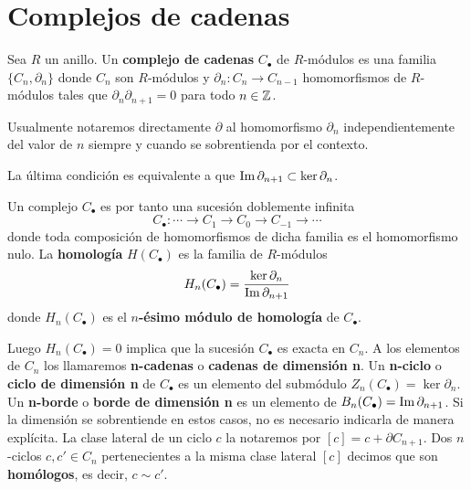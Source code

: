 \section{Complejos de cadenas}

\begin{definicion}
	Sea \(R\) un anillo. Un \textbf{complejo de cadenas} \(C_{\bullet}\) de \(R\)-módulos
	es una familia \(\{C_{n}, \partial_{n}\}\) donde \(C_{n}\) son \(R\)-módulos y \(\partial
	_{n} : C_{n} \rightarrow C_{n-1}\) homomorfismos de \(R\)-módulos tales que \(\partial
	_{n} \partial_{n+1}= 0\) para todo \(n \in \mathbb{Z}\).
\end{definicion}
\begin{nota}
	Usualmente notaremos directamente \(\partial\) al homomorfismo \(\partial_{n}\) independientemente
	del valor de \(n\) siempre y cuando se sobrentienda por el contexto.
\end{nota}
\begin{observacion}
	La última condición es equivalente a que \(\operatorname{Im}{\partial_{n+1}}\subset \ker{\partial_n}\).
\end{observacion}
Un complejo \(C_{\bullet}\) es por tanto una sucesión doblemente infinita
\[
	C_{\bullet}: \cdots \rightarrow C_{1}\rightarrow C_{0} \rightarrow C_{-1}\rightarrow
	\cdots
\]
donde toda composición de homomorfismos de dicha familia es el homomorfismo nulo.
La \textbf{homología} \(H(C_{\bullet})\) es la familia de \(R\)-módulos
\[
	H_{n}(C_{\bullet}) = \frac{\ker \partial_{n}}{\operatorname{Im} \partial_{n+1}}
\]
donde \(H_{n}(C_{\bullet})\) es el \textbf{\(n\)-ésimo módulo de homología} de \(C_{\bullet}\).

Luego \(H_{n}(C_{\bullet})=0\) implica que la sucesión \(C_{\bullet}\) es exacta en \(C
_{n}\). A los elementos de \(C_{n}\) los llamaremos \textbf{n-cadenas} o \textbf{cadenas
de dimensión n}. Un \textbf{n-ciclo} o \textbf{ciclo de dimensión n} de \(C_{\bullet}\)
es un elemento del submódulo \(Z_{n}(C_{\bullet}) = \ker \partial_{n}\). Un
\textbf{n-borde} o \textbf{borde de dimensión n} es un elemento de
\(B_{n}(C_{\bullet})= \operatorname{Im}{\partial_{n+1}}\). Si la dimensión se sobrentiende en estos
casos, no es necesario indicarla de manera explícita. La clase lateral de un ciclo
\(c\) la notaremos por \([c] = c + \partial C_{n+1}\). Dos \(n\)-ciclos
\(c,c' \in C_{n}\) pertenecientes a la misma clase lateral \([c]\) decimos que son
\textbf{homólogos}, es decir, \(c \sim c'\).

